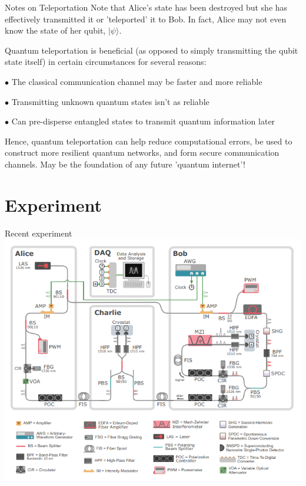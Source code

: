 \documentclass[11pt]{beamer}
\begin{document}
\begin{frame}{Notes on Teleportation}\small
Note that Alice's state has been destroyed but she has effectively transmitted it or 'teleported' it to Bob. In fact, Alice may not even know the state of her qubit, $\vert \psi\rangle$.

\pause

\vspace{.45cm}

Quantum teleportation is beneficial (as opposed to simply transmitting the qubit state itself) in certain circumstances for several reasons:

\pause

\medskip

$\bullet$ The classical communication channel may be faster and more reliable

\medskip\pause

$\bullet$ Transmitting unknown quantum states isn't as reliable

\medskip\pause

$\bullet$ Can pre-disperse entangled states to transmit quantum information later

\vspace{.45cm}\pause

Hence, quantum teleportation can help reduce computational errors, be used to construct more resilient quantum networks, and form secure communication channels. May be the foundation of any 
future 'quantum internet'!

\end{frame}

\section{Experiment}
\begin{frame}{Recent experiment}
\includegraphics[scale=0.5]{experiment.png}\cite{PRXQuantum.1.020317}

\end{frame}
\end{document}
